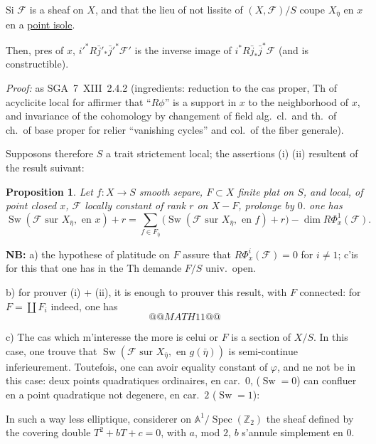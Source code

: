 \documentclass[11pt,a4paper]{article}
\theoremstyle{plain}
\newtheorem{proposition}[theorem]{Proposition}
\theoremstyle{definition}
\DeclareMathOperator{\Sw}{Sw}
\DeclareMathOperator{\Spec}{Spec}
\begin{document}
Si $\mathcal{F}$ is a sheaf on $X$, and that the lieu of not lissite of $(X, \mathcal{F})/S$ coupe $X_{\bar{\eta}}$ en $x$ en a \underline{point isole}.

Then, pres of $x$, $i'^* R\bar{j}'_* \bar{j}'^* \mathcal{F}'$ is the inverse image of $i^* R\bar{j}_* \bar{j}^* \mathcal{F}$ (and is constructible).

\medskip

\noindent \textit{Proof:} as SGA~7~XIII~2.4.2 (ingredients: reduction to the cas proper, Th of acyclicite local for affirmer that ``$R\phi$'' is a support in $x$ to the neighborhood of $x$, and invariance of the cohomology by changement of field alg.\ cl.\ and th.\ of ch.\ of base proper for relier ``vanishing cycles'' and col.\ of the fiber generale).

\medskip

Supposons therefore $S$ a trait strictement local; the assertions (i) (ii) resultent of the result suivant:

\begin{proposition}
Let $f: X \to S$ smooth separe, $F \subset X$ finite plat on $S$, and local, of point closed $x$, $\mathcal{F}$ locally constant of rank $r$ on $X - F$, prolonge by $0$. one has
\[
\Sw(\mathcal{F} \text{ sur } X_{\bar{\eta}}, \text{ en } x) + r = \sum_{f \in F_{\bar{\eta}}} \bigl(\Sw(\mathcal{F} \text{ sur } X_{\bar{\eta}}, \text{ en } f) + r\bigr) - \dim R\Phi_x^1(\mathcal{F}).
\]
\end{proposition}

\medskip

\noindent \textbf{NB:} a) the hypothese of platitude on $F$ assure that $R\Phi_x^i(\mathcal{F}) = 0$ for $i \neq 1$; c'is for this that one has in the Th demande $F/S$ univ.\ open.

b) for prouver (i) + (ii), it is enough to prouver this result, with $F$ connected: for $F = \coprod F_i$ indeed, one has
\[
@@MATH11@@
\]

c) The cas which m'interesse the more is celui or $F$ is a section of $X/S$. In this case, one trouve that $\Sw(\mathcal{F} \text{ sur } X_{\bar{\eta}}, \text{ en } g(\bar{\eta}))$ is semi-continue inferieurement. Toutefois, one can avoir equality constant of $\varphi$, and ne not be in this case: deux points quadratiques ordinaires, en car.\ $0$, ($\Sw = 0$) can confluer en a point quadratique not degenere, en car.\ $2$ ($\Sw = 1$):

\medskip

In such a way less elliptique, considerer on $\mathbb{A}^1/\Spec(\mathbb{Z}_2)$ the sheaf defined by the covering double $T^2 + bT + c = 0$, with $a$, mod $2$, $b$ s'annule simplement en $0$.
\end{document}
